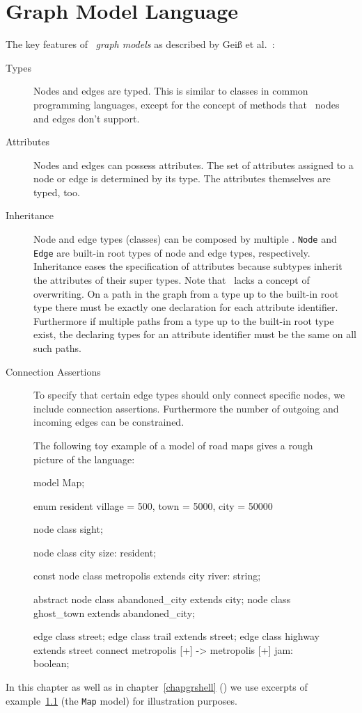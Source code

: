 \chapter{Graph Model Language}
\label{chapmodellang}
The key features of \GrG\ \emph{graph models} as described by Geiß et al.~\cite{GBGHS:06,KG:07}:

\begin{description}
\item[Types] Nodes and edges are typed. 
  This is similar to classes in common programming languages, except for the concept of methods that \GrG\ nodes and edges don't support. 
\item[Attributes] Nodes and edges can possess attributes. The set of attributes assigned to a node or edge is determined by its type. The attributes themselves are typed, too.
\item[Inheritance] Node and edge types (classes) can be composed by multiple . \texttt{Node} and \texttt{Edge} are built-in root types of node and edge types, respectively. Inheritance eases the specification of attributes because subtypes inherit the attributes of their super types. Note that \GrG\ lacks a concept of overwriting. On a path in the  graph from a type up to the built-in root type there must be exactly one declaration for each attribute identifier. Furthermore if multiple paths from a type up to the built-in root type exist, the declaring types for an attribute identifier must be the same on all such paths.
\item[Connection Assertions] To specify that certain edge types should only connect specific nodes, we include connection assertions. Furthermore the number of outgoing and incoming edges can be constrained.
\end{description}

\begin{figure}[htbf]
\begin{example}\label{ex:model:map}
The following toy example of a model of road maps gives a rough picture of the language:
\begin{grgen}
model Map;

enum resident {village = 500, town = 5000, city = 50000}

node class sight;

node class city {
	size: resident;
}

const node class metropolis extends city {
  river: string;
}  

abstract node class abandoned_city extends city;
node class ghost_town extends abandoned_city;

edge class street;
edge class trail extends street;
edge class highway extends street
    connect metropolis [+] -> metropolis [+]
{
    jam: boolean;
}
\end{grgen}
\end{example}
\end{figure}
In this chapter as well as in chapter~\ref{chapgrshell} (\GrShell) we use excerpts of example~\ref{ex:model:map} (the \texttt{Map} model) for illustration purposes.

